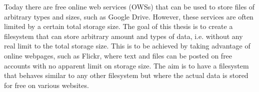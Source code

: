 



Today there are free online web services (OWSs) that can be used to store files of arbitrary types and sizes, such as Google Drive. However, these services are often limited by a certain total storage size. The goal of this thesis is to create a filesystem that can store arbitrary amount and types of data, i.e. without any real limit to the total storage size. This is to be achieved by taking advantage of online webpages, such as Flickr, where text and files can be posted on free accounts with no apparent limit on storage size. The aim is to have a filesystem that behaves similar to any other filesystem but where the actual data is stored for free on various websites. 


